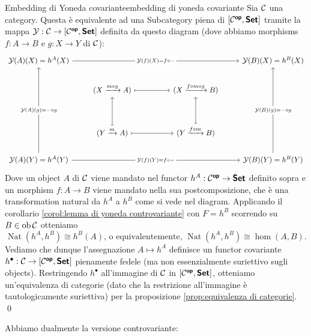 \documentclass{article}
\renewcommand\C{\mc{C}}
\newcommand\nat{\operatorname{Nat}}
\begin{document}
\begin{theorem}{Embedding di Yoneda covariante}{embedding di yoneda covariante}
    Sia $\C$ una category. Questa è equivalente ad una Subcategory piena di $[\C^\op, \setcat]$ tramite la mappa $\mc{Y} : \C \to [\C^\op, \setcat]$ definita da questo diagram (dove abbiamo morphisms $f:A\to B$ e $g:X\to Y$ di $\C$):
    \[\begin{tikzcd}
    	{\mc{Y}(A)(X) = h^A(X)} &&&& {\mc{Y}(B)(X) = h^B(X)} \\
    	& {(X \xrightarrow{m\circ g} A)} && {(X \xrightarrow{f\circ m\circ g} B)} \\
    	\\
    	& {(Y \xrightarrow{m} A)} && {(Y \xrightarrow{f\circ m} B)} \\
    	{\mc{Y}(A)(Y) = h^A(Y)} &&&& {\mc{Y}(B)(Y) = h^B(Y)}
    	\arrow["{\mc{Y}(f)(X) = f\circ -}"{description}, from=1-1, to=1-5]
    	\arrow[maps to, from=2-2, to=2-4]
    	\arrow[maps to, from=4-2, to=2-2]
    	\arrow[maps to, from=4-2, to=4-4]
    	\arrow[maps to, from=4-4, to=2-4]
    	\arrow["{\mc{Y}(A)(g) = -\circ g}"{description}, from=5-1, to=1-1]
    	\arrow["{\mc{Y}(f)(Y) = f\circ -}"{description}, from=5-1, to=5-5]
	    \arrow["{\mc{Y}(B)(g) = -\circ g}"{description}, from=5-5, to=1-5]
    \end{tikzcd}\]
    Dove un object $A$ di $\C$ viene mandato nel functor $h^A : \C^\op \to \setcat$ definito sopra e un morphism $f:A\to B$ viene mandato nella sua postcomposizione, che è una transformation natural da $h^A$ a $h^B$ come si vede nel diagram.
    \proof
    Applicando il corollario \ref{corol:lemma di yoneda controvariante} con $F = h^B$ scorrendo su $B \in \ob\C$ otteniamo
    \[\nat(h^A, h^B) \cong h^B(A) \text{, o equivalentemente, } \nat(h^A, h^B)\cong \hom(A,B).\]
    Vediamo che dunque l'assegnazione $A\mapsto h^A$ definisce un functor covariante $h^\bullet : \C\to [\C^\op,\setcat]$ pienamente fedele (ma non essenzialmente suriettivo sugli objects). Restringendo $h^\bullet$ all'immagine di $\C$ in $[\C^\op,\setcat]$, otteniamo un'equivalenza di categorie (dato che la restrizione all'immagine è tautologicamente suriettiva) per la proposizione \ref{prop:equivalenza di categorie}.
    \qed
\end{theorem}

Abbiamo dualmente la versione controvariante:
\end{document}
